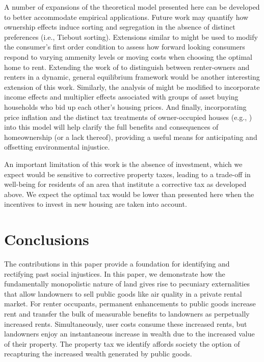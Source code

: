 \documentclass[ecta,nameyear,draft]{econsocart}
\theoremstyle{plain}
\theoremstyle{remark}
\begin{document}
A number of expansions of the theoretical model presented here can be developed to better accommodate empirical applications. Future work may quantify how ownership effects induce sorting and segregation in the absence of distinct preferences (i.e., Tiebout sorting). Extensions similar to \cite{bishop19} might be used to modify the consumer's first order condition to assess how forward looking consumers respond to varying ammenity levels or moving costs when choosing the optimal home to rent.  Extending the work of \cite{kanemoto88} to distinguish between renter-owners and renters in a dynamic, general equilibrium framework would be another interesting extension of this work. Similarly, the analysis of \cite{gervais2002} might be modified to incorporate income effects and multiplier effects associated with groups of asset buying households who bid up each other's housing prices. And finally, incorporating price inflation and the distinct tax treatments of owner-occupied  houses (e.g., \cite{poterba84}) into this model will help clarify the full benefits and consequences of homeownership (or a lack thereof), providing a useful means for anticipating and offsetting environmental injustice.

An important limitation of this work is the absence of investment, which we expect would be sensitive to corrective property taxes, leading to a trade-off in well-being for residents of an area that institute a corrective tax as developed above. We expect the optimal tax would be lower than presented here when the incentives to invest in new housing are taken into account.


\section{Conclusions}
The contributions in this paper provide a foundation for identifying and rectifying past social injustices. In this paper, we demonstrate how the fundamentally monopolistic nature of land gives rise to pecuniary externalities that allow landowners to sell public goods like air quality in a private rental market. For renter occupants, permanent enhancements to public goods increase rent and transfer the bulk of measurable benefits to landowners as perpetually increased rents. Simultaneously, user costs consume these increased rents, but landowners enjoy an instantaneous increase in wealth due to the increased value of their property. The property tax we identify affords society the option of recapturing the increased wealth generated by public goods. 
\end{document}
